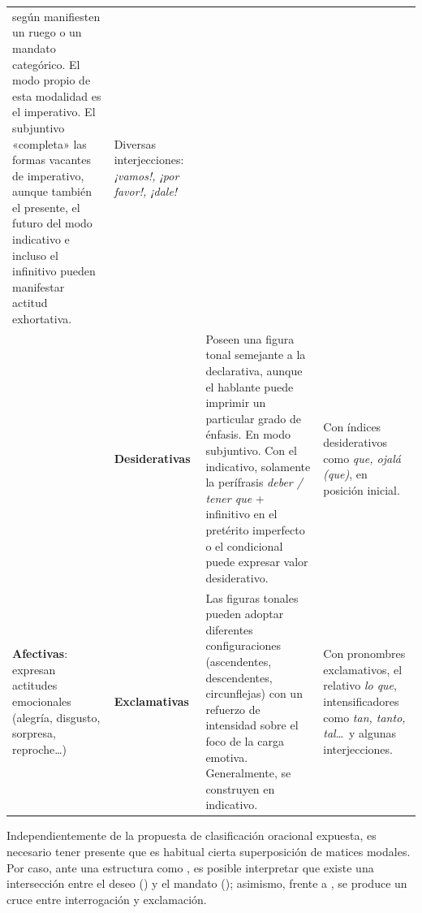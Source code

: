 {\begin{longtable}{@{}>{\raggedright\arraybackslash}p{23mm}
    >{\raggedright\arraybackslash}p{25mm} >{\raggedright\arraybackslash}p{45mm}
    >{\raggedright\arraybackslash}p{30mm}@{}}
    según manifiesten un ruego o un mandato categórico. El modo propio de esta
    modalidad es el imperativo. El subjuntivo «completa» las formas vacantes de
    imperativo, aunque también el presente, el futuro del modo indicativo e
    incluso el infinitivo pueden manifestar actitud exhortativa. &
    Diversas interjecciones: \textit{¡vamos!, ¡por favor!, ¡dale!} \\
  \addlinespace
  & \textbf{Desiderativas} &
    Poseen una figura tonal semejante a la declarativa, aunque el hablante puede
    imprimir un particular grado de énfasis. En modo subjuntivo. Con el
    indicativo, solamente la perífrasis \textit{deber / tener que} + infinitivo
    en el pretérito imperfecto o el condicional puede expresar valor
    desiderativo. &
    Con índices desiderativos como \textit{que, ojalá (que)}, en posición
    inicial. \\
  \midrule
  \textbf{Afectivas}: expresan actitudes emocionales (alegría, disgusto,
    sorpresa, reproche\ldots) &
    \textbf{Exclamativas} &
    Las figuras tonales pueden adoptar diferentes configuraciones (ascendentes,
    descendentes, circunflejas) con un refuerzo de intensidad sobre el foco de
    la carga emotiva. Generalmente, se construyen en indicativo. &
    Con pronombres exclamativos, el relativo \textit{lo que}, intensificadores
    como \textit{tan, tanto, tal}\ldots\ y algunas interjecciones. \\
  \bottomrule
\end{longtable}}

Independientemente de la propuesta de clasificación oracional expuesta, es
necesario tener presente que es habitual cierta superposición de matices
modales. Por caso, ante una estructura como , es
posible interpretar que existe una intersección entre el deseo () y el mandato (); asimismo,
frente a , se produce un cruce entre
interrogación y exclamación.

